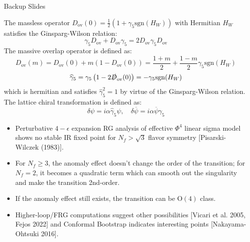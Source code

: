 \documentclass[10pt, aspectratio=169]{beamer} %
\begin{document}
\begin{frame}[noframenumbering]
\centering
\Huge Backup Slides
\end{frame}

\begin{frame}[noframenumbering]
\vfill
The massless operator $D_{\mathrm{ov}}(0) = \frac{1}{2} (1 + \gamma_5 \mathrm{sgn}(H_W))$ with Hermitian $H_W$ satisfies the Ginsparg-Wilson relation:
\[ \gamma_5 D_{\mathrm{ov}} + D_{\mathrm{ov}} \gamma_5 = 2 D_{\mathrm{ov}} \gamma_5 D_{\mathrm{ov}} \]
The massive overlap operator is defined as:
\[ D_{\mathrm{ov}}(m) = D_{\mathrm{ov}}(0) + m (1 - D_{\mathrm{ov}}(0)) = \frac{1+m}{2} + \frac{1-m}{2} \gamma_5 \mathrm{sgn}(H_W) \]
\begin{equation}
\widehat{\gamma}_5 = \gamma_5 \left( 1 - 2 \slashed{D}_{\mathrm{ov}}(0) \right) = -\gamma_5 \mathrm{sgn}(H_W)
\label{eq:hat_gamma_5}
\end{equation}
which is hermitian and satisfies $\widehat{\gamma}_5^2 = 1$ by virtue of the Ginsparg-Wilson relation. The lattice chiral transformation is defined as:
\begin{equation}
\delta \psi = i \alpha \widehat{\gamma}_5 \psi, \quad \delta \overline{\psi} = i \alpha \overline{\psi} \gamma_5
\label{eq:overlap_chiral_trans}
\end{equation}
\vfill
\end{frame}

\begin{frame}[noframenumbering]
\vfill
{}
\fontsize{9.5pt}{11.5pt}\selectfont
\begin{itemize}
    \item Perturbative $4-\epsilon$ expansion RG analysis of effective $\Phi^4$ linear sigma model shows no stable IR fixed point for $N_f > \sqrt{3}$ flavor symmetry {\scriptsize [Pisarski-Wilczek (1983)]}.
    \item For $N_f \geq 3$, the anomaly effect doesn't change the order of the transition; for $N_f=2$, it becomes a quadratic term which can smooth out the singularity and make the transition 2nd-order.
    \item If the anomaly effect still exists, the transition can be $\mathrm{O}(4)$ class.
    \item Higher-loop/FRG computations suggest other possibilities {\scriptsize [Vicari et al. 2005, Fejos 2022]} and Conformal Bootstrap indicates interesting points {\scriptsize [Nakayama-Ohtsuki 2016]}.
\end{itemize}
\vfill
\end{frame}
\end{document}
